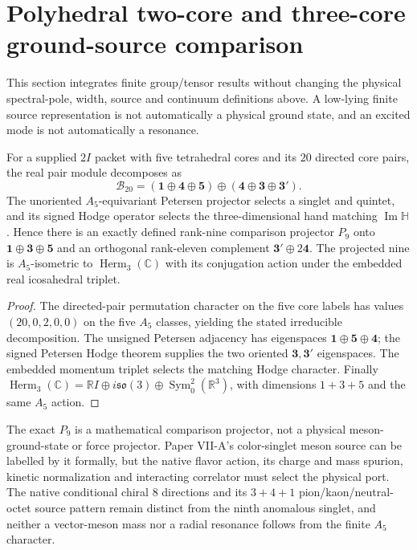 \documentclass[12pt,a4paper]{article}
\begin{document}
\section{Polyhedral two-core and three-core ground-source comparison}
\label{p11:sec:v1158-two-three-core-ground-structure}
This section integrates finite group/tensor results without changing
the physical spectral-pole, width, source and continuum definitions above.
A low-lying finite source representation is not automatically a
physical ground state, and an excited mode is not automatically a resonance.

\begin{theorem}
\label{p11:thm:v1158-directed-two-core-nonet}
For a supplied $2I$ packet with five tetrahedral cores and its
$20$ directed core pairs, the real pair module decomposes as
\[
 \boxed{\mathcal B_{20}=(\mathbf1\oplus\mathbf4\oplus\mathbf5)
              \oplus(\mathbf4\oplus\mathbf3\oplus\mathbf3').}
\]
The unoriented $A_5$-equivariant Petersen projector selects a
singlet and quintet, and its signed Hodge operator selects the
three-dimensional hand matching $\operatorname{Im}\mathbb H$.
Hence there is an exactly defined rank-nine comparison projector
$P_9$ onto $\mathbf1\oplus\mathbf3\oplus\mathbf5$ and an
orthogonal rank-eleven complement $\mathbf3'\oplus2\mathbf4$.
The projected nine is $A_5$-isometric to
$\operatorname{Herm}_3(\mathbb C)$ with its conjugation action
under the embedded real icosahedral triplet.
\end{theorem}
\begin{proof}
The directed-pair permutation character on the five core labels
has values $(20,0,2,0,0)$ on the five $A_5$ classes, yielding the
stated irreducible decomposition.  The unsigned Petersen
adjacency has eigenspaces $\mathbf1\oplus\mathbf5\oplus\mathbf4$;
the signed Petersen Hodge theorem supplies the two oriented
$\mathbf3,\mathbf3'$ eigenspaces.  The embedded momentum triplet
selects the matching Hodge character.  Finally
$\operatorname{Herm}_3(\mathbb C)=\mathbb RI\oplus
 i\mathfrak{so}(3)\oplus\operatorname{Sym}_0^2(\mathbb R^3)$,
with dimensions $1+3+5$ and the same $A_5$ action.
\end{proof}
\begin{remark}
\label{p11:rem:v1158-meson-ground-pole-gate}
The exact $P_9$ is a mathematical comparison projector, not a
physical meson-ground-state or force projector.  Paper VII-A's
color-singlet meson source can be labelled by it formally, but
the native flavor action, its charge and mass spurion,
kinetic normalization and interacting correlator must select the
physical port.  The native conditional chiral $8$ directions and
its $3+4+1$ pion/kaon/neutral-octet source pattern remain distinct
from the ninth anomalous singlet, and neither a vector-meson mass
nor a radial resonance follows from the finite $A_5$ character.
\end{remark}
\end{document}
